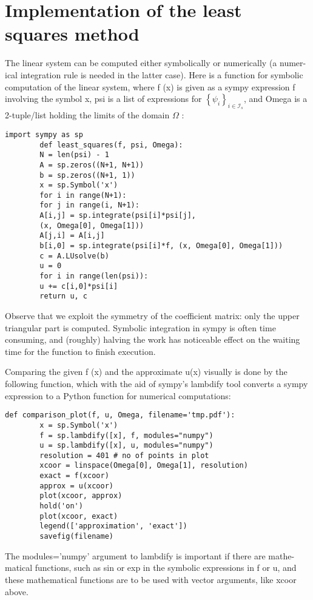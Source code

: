 \documentclass[../main.tex]{subfiles}
\begin{document}
	\section[Implementation of the least squares method]{Implementation of the least squares method}
	\label{sec:sec_2_4}
	\noindent The linear system can be computed either symbolically or numerically (a numer-
	ical integration rule is needed in the latter case). Here is a function for symbolic
	computation of the linear system, where f (x) is given as a sympy expression f
	involving the symbol x, psi is a list of expressions for $\left\{\psi_{i}\right\}_{i \in \mathcal{I}_{s}}$, and Omega is a 2-tuple/list holding the limits of the domain $\Omega$ :
	
	\begin{lstlisting}[numbers=none]
		import sympy as sp
		def least_squares(f, psi, Omega):
		N = len(psi) - 1
		A = sp.zeros((N+1, N+1))
		b = sp.zeros((N+1, 1))
		x = sp.Symbol('x')
		for i in range(N+1):
		for j in range(i, N+1):
		A[i,j] = sp.integrate(psi[i]*psi[j],
		(x, Omega[0], Omega[1]))
		A[j,i] = A[i,j]
		b[i,0] = sp.integrate(psi[i]*f, (x, Omega[0], Omega[1]))
		c = A.LUsolve(b)
		u = 0
		for i in range(len(psi)):
		u += c[i,0]*psi[i]
		return u, c
	\end{lstlisting}
	Observe that we exploit the symmetry of the coefficient matrix: only the
	upper triangular part is computed. Symbolic integration in sympy is often
	time consuming, and (roughly) halving the work has noticeable effect on the
	waiting time for the function to finish execution.
	
	Comparing the given f (x) and the approximate u(x) visually is done by
	the following function, which with the aid of sympy's lambdify tool converts a
	sympy expression to a Python function for numerical computations:
	\begin{lstlisting}[numbers=none]
		def comparison_plot(f, u, Omega, filename='tmp.pdf'):
		x = sp.Symbol('x')
		f = sp.lambdify([x], f, modules="numpy")
		u = sp.lambdify([x], u, modules="numpy")
		resolution = 401 # no of points in plot
		xcoor = linspace(Omega[0], Omega[1], resolution)
		exact = f(xcoor)
		approx = u(xcoor)
		plot(xcoor, approx)
		hold('on')
		plot(xcoor, exact)
		legend(['approximation', 'exact'])
		savefig(filename)
	\end{lstlisting}
	The modules='numpy' argument to lambdify is important if there are mathe-
	matical functions, such as sin or exp in the symbolic expressions in f or u, and
	these mathematical functions are to be used with vector arguments, like xcoor
	above.
	
\end{document}
